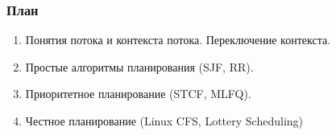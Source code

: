 \begin{frame}
\frametitle{План}

\begin{enumerate}
  \item Понятия потока и контекста потока. Переключение контекста.
  \item Простые алгоритмы планирования (SJF, RR).
  \item Приоритетное планирование (STCF, MLFQ).
  \item Честное планирование (Linux CFS, Lottery Scheduling)
\end{enumerate}
\end{frame}
